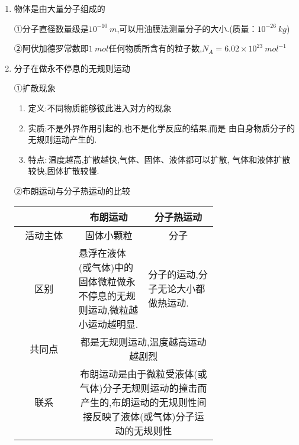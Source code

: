 

\begin{enumerate}
\renewcommand{\labelenumi}{\arabic{enumi}.}
\item
物体是由大量分子组成的

①分子直径数量级是$ 10^{-10}\ m $,可以用油膜法测量分子的大小.(质量：$ 10^{-26}\ kg $)

②阿伏加德罗常数即$ 1\ mol $任何物质所含有的粒子数,$ N_{A}=6.02\times10^{23}\ mol^{-1} $

\item 
分子在做永不停息的无规则运动

①扩散现象

\begin{enumerate}
\renewcommand{\labelenumii}{\alph{enumii}.}
\item
定义:不同物质能够彼此进入对方的现象

\item 
实质:不是外界作用引起的,也不是化学反应的结果,而是
由自身物质分子的无规则运动产生的.

\item 
特点$ : $温度越高,扩散越快,气体、固体、液体都可以扩散,
气体和液体扩散较快,固体扩散较慢.	



\end{enumerate}

②布朗运动与分子热运动的比较
\begin{table}[h!]
\centering 
\begin{tabular}{|c|m{0.35\linewidth}|m{0.35\linewidth}|}
\hline 
& \multicolumn{1}{c|}{布朗运动} & \multicolumn{1}{c|}{分子热运动}
\\
\hline
活动主体 & \multicolumn{1}{c|}{固体小颗粒} & \multicolumn{1}{c|}{分子}
\\
\hline
区别 & 悬浮在液体(或气体)中的固体微粒做永不停息的无规则运动,微粒越小运动越明显. & 分子的运动,分子无论大小都做热运动.
\\
\hline
共同点 & \multicolumn{2}{c|}{都是无规则运动,温度越高运动越剧烈} 
\\
\hline
联系 & \multicolumn{2}{c|}{\begin{minipage}[h!]{0.7\linewidth}
\flushleft
\vspace{0.3em}
布朗运动是由于微粒受液体(或气体)分子无规则运动的撞击而产生的,布朗运动的无规则性间接反映了液体(或气体)分子运动的无规则性
\vspace{0.3em}
\end{minipage} } 
\\
\hline
\end{tabular}
\end{table} 


\end{enumerate}
